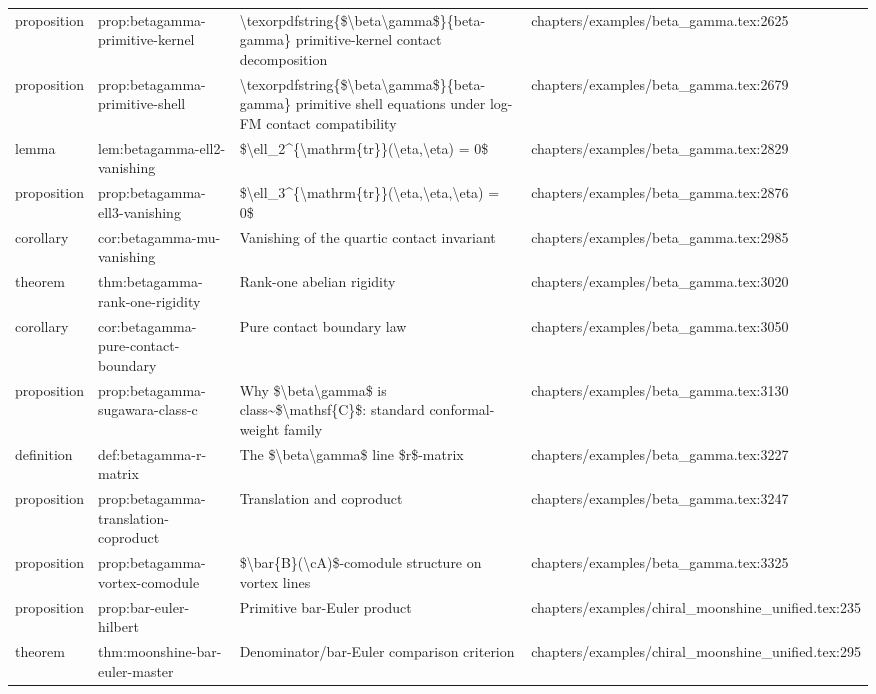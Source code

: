 \documentclass[11pt]{article}
\begin{document}
\begin{longtable}{L{0.10\textwidth}L{0.26\textwidth}L{0.42\textwidth}L{0.22\textwidth}}
proposition & prop:betagamma-primitive-kernel & \textbackslash{}texorpdfstring\{\$\textbackslash{}beta\textbackslash{}gamma\$\}\{beta-gamma\} primitive-kernel contact decomposition & chapters/examples/beta\_gamma.tex:2625\\
proposition & prop:betagamma-primitive-shell & \textbackslash{}texorpdfstring\{\$\textbackslash{}beta\textbackslash{}gamma\$\}\{beta-gamma\} primitive shell equations under log-FM contact compatibility & chapters/examples/beta\_gamma.tex:2679\\
lemma & lem:betagamma-ell2-vanishing & \$\textbackslash{}ell\_2\textasciicircum{}\{\textbackslash{}mathrm\{tr\}\}(\textbackslash{}eta,\textbackslash{}eta) = 0\$ & chapters/examples/beta\_gamma.tex:2829\\
proposition & prop:betagamma-ell3-vanishing & \$\textbackslash{}ell\_3\textasciicircum{}\{\textbackslash{}mathrm\{tr\}\}(\textbackslash{}eta,\textbackslash{}eta,\textbackslash{}eta) = 0\$ & chapters/examples/beta\_gamma.tex:2876\\
corollary & cor:betagamma-mu-vanishing & Vanishing of the quartic contact invariant & chapters/examples/beta\_gamma.tex:2985\\
theorem & thm:betagamma-rank-one-rigidity & Rank-one abelian rigidity & chapters/examples/beta\_gamma.tex:3020\\
corollary & cor:betagamma-pure-contact-boundary & Pure contact boundary law & chapters/examples/beta\_gamma.tex:3050\\
proposition & prop:betagamma-sugawara-class-c & Why \$\textbackslash{}beta\textbackslash{}gamma\$ is class\textasciitilde{}\$\textbackslash{}mathsf\{C\}\$: standard conformal-weight family & chapters/examples/beta\_gamma.tex:3130\\
definition & def:betagamma-r-matrix & The \$\textbackslash{}beta\textbackslash{}gamma\$ line \$r\$-matrix & chapters/examples/beta\_gamma.tex:3227\\
proposition & prop:betagamma-translation-coproduct & Translation and coproduct & chapters/examples/beta\_gamma.tex:3247\\
proposition & prop:betagamma-vortex-comodule & \$\textbackslash{}bar\{B\}(\textbackslash{}cA)\$-comodule structure on vortex lines & chapters/examples/beta\_gamma.tex:3325\\
proposition & prop:bar-euler-hilbert & Primitive bar-Euler product & chapters/examples/chiral\_moonshine\_unified.tex:235\\
theorem & thm:moonshine-bar-euler-master & Denominator/bar-Euler comparison criterion & chapters/examples/chiral\_moonshine\_unified.tex:295\\

\end{longtable}
\end{document}
